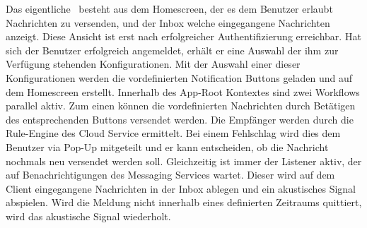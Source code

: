 Das eigentliche~\emph{} besteht aus dem Homescreen,
der es dem Benutzer erlaubt Nachrichten zu versenden, und der Inbox welche eingegangene Nachrichten anzeigt.
Diese Ansicht ist erst nach erfolgreicher Authentifizierung erreichbar.
Hat sich der Benutzer erfolgreich angemeldet, erhält er eine Auswahl der ihm zur Verfügung stehenden Konfigurationen.
Mit der Auswahl einer dieser Konfigurationen werden die vordefinierten Notification Buttons geladen und auf dem Homescreen erstellt.
Innerhalb des App-Root Kontextes sind zwei Workflows parallel aktiv.
Zum einen können die vordefinierten Nachrichten durch Betätigen des entsprechenden Buttons versendet werden.
Die Empfänger werden durch die Rule-Engine des Cloud Service ermittelt.
Bei einem Fehlschlag wird dies dem Benutzer via Pop-Up mitgeteilt und er kann entscheiden, ob die Nachricht nochmals neu versendet werden soll.
Gleichzeitig ist immer der Listener aktiv, der auf Benachrichtigungen des Messaging Services wartet.
Dieser wird auf dem Client eingegangene Nachrichten in der Inbox ablegen und ein akustisches Signal abspielen.
Wird die Meldung nicht innerhalb eines definierten Zeitraums quittiert, wird das akustische Signal wiederholt.
\clearpage

